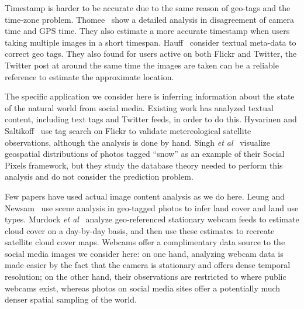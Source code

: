Timestamp is harder to be accurate due to the same reason of geo-tags and the time-zone problem. 
Thomee\etal~\cite{thomee2014s}  show  a detailed analysis in disagreement of camera time and GPS time. They also estimate a more accurate timestamp when users taking multiple images in a short timespan.
Hauff\etal~\cite{hauff2012geo} consider textual meta-data to correct geo tags. 
They also found for users active on both Flickr and Twitter, the Twitter post at around the same time the images are taken can be a reliable reference to estimate the approximate location.





The specific application we consider here is inferring
information about the state of the natural world from social media.
Existing work has analyzed textual content, including text tags and
Twitter feeds, in order to do this. Hyvarinen and
Saltikoff~\cite{meteo} use tag search on Flickr to validate
metereological satellite observations, although the analysis is done
by hand. Singh \textit{et al}~\cite{singh10socialpixels} visualize geospatial
distributions of photos tagged ``snow'' as an example of
their Social Pixels framework, but they study the
database theory needed to perform this analysis
and do not consider the prediction problem.  





Few papers have used actual image content
analysis as we do here. Leung and Newsam~\cite{Leung:2010wa} use scene
analysis in geo-tagged photos to infer land cover and land use types.
Murdock \textit{et al}~\cite{murdock} analyze geo-referenced
stationary webcam feeds to estimate cloud cover on a day-by-day
basis, and then use these estimates to recreate satellite cloud cover
maps.  Webcams offer a complimentary data source to the social media
images we consider here: on one hand, analyzing webcam data is made
easier by the fact that the camera is stationary and offers dense
temporal resolution; on the other hand, their observations are restricted to 
where public webcams exist, whereas photos on social media sites 
offer a potentially much denser spatial sampling of the world.

